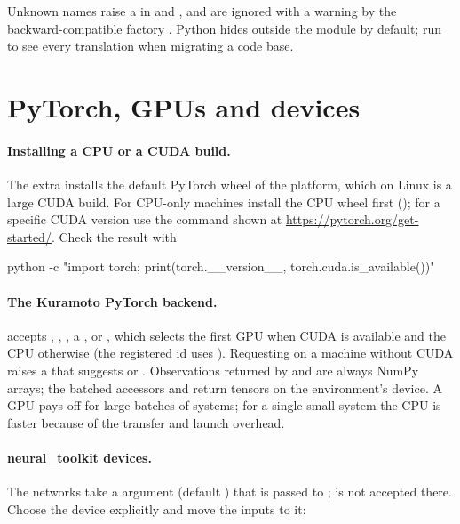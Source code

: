 Unknown names raise a  in  and
, and are ignored with a warning by the
backward-compatible factory . Python hides
 outside the  module by default;
run  to see every
translation when migrating a code base.

\section{PyTorch, GPUs and devices}\label{sec:trouble-torch}

\paragraph{Installing a CPU or a CUDA build.}
The  extra installs the default PyTorch wheel of the platform,
which on Linux is a large CUDA build. For CPU-only machines install the CPU
wheel first (); for a specific CUDA version use the
command shown at \url{https://pytorch.org/get-started/}. Check the result
with

\begin{shellcode}
python -c "import torch; print(torch.__version__, torch.cuda.is_available())"
\end{shellcode}

\paragraph{The Kuramoto PyTorch backend.}
 accepts ,
, , a , or
, which selects the first GPU when CUDA is available and the CPU
otherwise (the registered id  uses
). Requesting  on a machine without CUDA raises a
 that suggests  or . Observations
returned by  and  are always NumPy arrays; the batched
accessors  and 
return tensors on the environment's device. A GPU pays off for large batches
of systems; for a single small system the CPU is faster because of the
transfer and launch overhead.

\paragraph{neural\_toolkit devices.}
The networks take a  argument (default ) that is
passed to ;  is not accepted there. Choose the
device explicitly and move the inputs to it:

